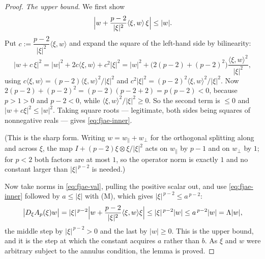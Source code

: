 \begin{proof}
\medskip\noindent\emph{The upper bound.}
We first show
\begin{equation}\label{eq:fjae-inner}
  \Bigl\lvert w+\frac{p-2}{\lvert\xi\rvert^{2}}\langle\xi,w\rangle\,\xi\Bigr\rvert
  \le\lvert w\rvert .
\end{equation}
Put $c:=\dfrac{p-2}{\lvert\xi\rvert^{2}}\langle\xi,w\rangle$ and expand the square of the
left-hand side by bilinearity:
\[
  \lvert w+c\,\xi\rvert^{2}
  =\lvert w\rvert^{2}+2c\langle\xi,w\rangle+c^{2}\lvert\xi\rvert^{2}
  =\lvert w\rvert^{2}+\bigl(2(p-2)+(p-2)^{2}\bigr)
    \frac{\langle\xi,w\rangle^{2}}{\lvert\xi\rvert^{2}} ,
\]
using $c\langle\xi,w\rangle=(p-2)\langle\xi,w\rangle^{2}/\lvert\xi\rvert^{2}$ and
$c^{2}\lvert\xi\rvert^{2}=(p-2)^{2}\langle\xi,w\rangle^{2}/\lvert\xi\rvert^{2}$.  Now
$2(p-2)+(p-2)^{2}=(p-2)(p-2+2)=p(p-2)<0$, because $p>1>0$ and $p-2<0$, while
$\langle\xi,w\rangle^{2}/\lvert\xi\rvert^{2}\ge0$.  So the second term is $\le0$ and
$\lvert w+c\xi\rvert^{2}\le\lvert w\rvert^{2}$.  Taking square roots --- legitimate, both sides
being squares of nonnegative reals --- gives \eqref{eq:fjae-inner}.

(This is the sharp form.  Writing $w=w_\parallel+w_\perp$ for the orthogonal splitting along and
across $\xi$, the map $I+(p-2)\xi\otimes\xi/\lvert\xi\rvert^{2}$ acts on $w_\parallel$ by $p-1$
and on $w_\perp$ by $1$; for $p<2$ both factors are at most $1$, so the operator norm is exactly
$1$ and no constant larger than $\lvert\xi\rvert^{\,p-2}$ is needed.)

Now take norms in \eqref{eq:fjae-val}, pulling the positive scalar out, and use
\eqref{eq:fjae-inner} followed by $a\le\lvert\xi\rvert$ with (M), which gives
$\lvert\xi\rvert^{\,p-2}\le a^{\,p-2}$:
\[
  \bigl\lvert D_\xi A_p(\xi)w\bigr\rvert
  =\lvert\xi\rvert^{\,p-2}\Bigl\lvert w+\frac{p-2}{\lvert\xi\rvert^{2}}\langle\xi,w\rangle\xi
    \Bigr\rvert
  \le\lvert\xi\rvert^{\,p-2}\lvert w\rvert
  \le a^{\,p-2}\lvert w\rvert=\Lambda\lvert w\rvert ,
\]
the middle step by $\lvert\xi\rvert^{\,p-2}>0$ and the last by $\lvert w\rvert\ge0$.  This is the
upper bound, and it is the step at which the constant acquires $a$ rather than $b$.  As $\xi$ and
$w$ were arbitrary subject to the annulus condition, the lemma is proved.
\end{proof}
